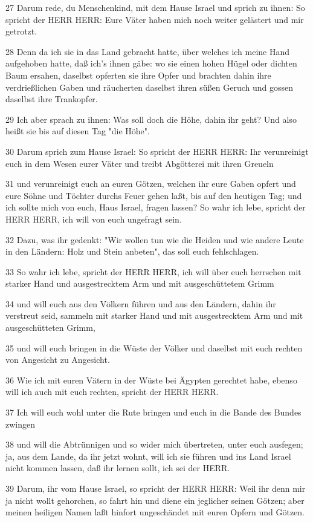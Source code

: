 \par 27 Darum rede, du Menschenkind, mit dem Hause Israel und sprich zu ihnen: So spricht der HERR HERR: Eure Väter haben mich noch weiter gelästert und mir getrotzt.
\par 28 Denn da ich sie in das Land gebracht hatte, über welches ich meine Hand aufgehoben hatte, daß ich's ihnen gäbe: wo sie einen hohen Hügel oder dichten Baum ersahen, daselbst opferten sie ihre Opfer und brachten dahin ihre verdrießlichen Gaben und räucherten daselbst ihren süßen Geruch und gossen daselbst ihre Trankopfer.
\par 29 Ich aber sprach zu ihnen: Was soll doch die Höhe, dahin ihr geht? Und also heißt sie bis auf diesen Tag "die Höhe".
\par 30 Darum sprich zum Hause Israel: So spricht der HERR HERR: Ihr verunreinigt euch in dem Wesen eurer Väter und treibt Abgötterei mit ihren Greueln
\par 31 und verunreinigt euch an euren Götzen, welchen ihr eure Gaben opfert und eure Söhne und Töchter durchs Feuer gehen laßt, bis auf den heutigen Tag; und ich sollte mich von euch, Haus Israel, fragen lassen? So wahr ich lebe, spricht der HERR HERR, ich will von euch ungefragt sein.
\par 32 Dazu, was ihr gedenkt: "Wir wollen tun wie die Heiden und wie andere Leute in den Ländern: Holz und Stein anbeten", das soll euch fehlschlagen.
\par 33 So wahr ich lebe, spricht der HERR HERR, ich will über euch herrschen mit starker Hand und ausgestrecktem Arm und mit ausgeschüttetem Grimm
\par 34 und will euch aus den Völkern führen und aus den Ländern, dahin ihr verstreut seid, sammeln mit starker Hand und mit ausgestrecktem Arm und mit ausgeschütteten Grimm,
\par 35 und will euch bringen in die Wüste der Völker und daselbst mit euch rechten von Angesicht zu Angesicht.
\par 36 Wie ich mit euren Vätern in der Wüste bei Ägypten gerechtet habe, ebenso will ich auch mit euch rechten, spricht der HERR HERR.
\par 37 Ich will euch wohl unter die Rute bringen und euch in die Bande des Bundes zwingen
\par 38 und will die Abtrünnigen und so wider mich übertreten, unter euch ausfegen; ja, aus dem Lande, da ihr jetzt wohnt, will ich sie führen und ins Land Israel nicht kommen lassen, daß ihr lernen sollt, ich sei der HERR.
\par 39 Darum, ihr vom Hause Israel, so spricht der HERR HERR: Weil ihr denn mir ja nicht wollt gehorchen, so fahrt hin und diene ein jeglicher seinen Götzen; aber meinen heiligen Namen laßt hinfort ungeschändet mit euren Opfern und Götzen.
